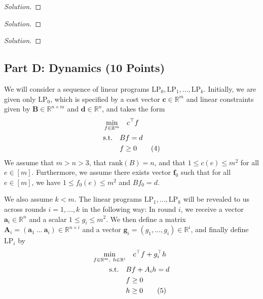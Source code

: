 \documentclass[a4paper,11pt]{article}
\newenvironment{solution}
  {\begin{proof}[Solution]}
  {\end{proof}}
\begin{document}
\begin{solution}
\end{solution}

\begin{solution}
\end{solution}

\begin{solution}
\end{solution}

\subsection*{Part D: Dynamics (10 Points)}
We will consider a sequence of linear programs \(\mathrm{LP}_0,\mathrm{LP}_1,\ldots ,\mathrm{LP}_k\). Initially, we are given only \(\mathrm{LP}_0\), which is specified by a cost vector \(\pmb{c}\in \mathbb{R}^{m}\) and linear constraints given by \(\pmb{B}\in \mathbb{R}^{n\times m}\) and \(\pmb{d}\in \mathbb{R}^{n}\), and takes the form
\begin{align}
    \min_{f\in \mathbb{R}^{m}} &\quad c^{\top}f \notag\\
    \mathrm{s.t.}\quad & B f = d \notag\\
    & f\geq 0 \tag{4}
\end{align}
We assume that \(m > n > 3\), that \(\mathrm{rank}(B) = n\), and that \(1\leq c(e)\leq m^{2}\) for all \(e\in [m]\). Furthermore, we assume there exists vector \(\pmb{f}_{0}\) such that for all \(e\in [m]\), we have \(1\leq f_{0}(e)\leq m^{2}\) and \(B f_{0} = d\).

We also assume \(k < m\). The linear programs \(\mathrm{LP}_1,\ldots ,\mathrm{LP}_k\) will be revealed to us across rounds \(i = 1,\ldots ,k\) in the following way: In round \(i\), we receive a vector \(\pmb{a}_i\in \mathbb{R}^{n}\) and a scalar \(1\leq g_i\leq m^{2}\). We then define a matrix \(\pmb{A}_i = (\pmb{a}_1\ \ldots\ \pmb{a}_i)\in \mathbb{R}^{n\times i}\) and a vector \(\pmb{g}_i = (g_1,\ldots ,g_i)\in \mathbb{R}^{i}\), and finally define \(\mathrm{LP}_i\) by
\begin{align}
    \min_{f\in \mathbb{R}^{m},\ h\in \mathbb{R}^{i}} &\quad c^{\top}f + g_i^{\top}h \notag\\
    \mathrm{s.t.}\quad & B f + A_i h = d \notag\\
    & f\geq 0 \notag\\
    & h\geq 0 \tag{5}
\end{align}
\end{document}
